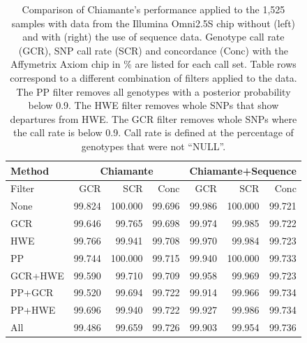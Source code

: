 \begin{table}[p]
\begin{center}
\begin{tabular}{|l|rrr|rrr|}
  \hline
  Method & \multicolumn{3}{c|}{Chiamante}& \multicolumn{3}{c|}{Chiamante+Sequence}\\
  \hline
  Filter & GCR & SCR & Conc & GCR & SCR & Conc \\ 
  \hline
  None & 99.824 & 100.000 & 99.696 & 99.986 & 100.000 & 99.721 \\ 
  GCR & 99.646 & 99.765 & 99.698 & 99.974 & 99.985 & 99.722 \\ 
  HWE & 99.766 & 99.941 & 99.708 & 99.970 & 99.984 & 99.723 \\ 
  PP & 99.744 & 100.000 & 99.715 & 99.940 & 100.000 & 99.733 \\ 
  \hline
  GCR+HWE & 99.590 & 99.710 & 99.709 & 99.958 & 99.969 & 99.723 \\ 
  PP+GCR & 99.520 & 99.694 & 99.722 & 99.914 & 99.966 & 99.734 \\ 
  PP+HWE & 99.696 & 99.940 & 99.722 & 99.927 & 99.986 & 99.734 \\ 
  \hline
  All & 99.486 & 99.659 & 99.726 & 99.903 & 99.954 & 99.736 \\ 
  \hline
\end{tabular}
\caption[Performance with and without and with the use of sequence data. ]{Comparison of Chiamante's performance applied to the 1,525 samples with data from the Illumina Omni2.5S chip without (left) and with (right) the use of sequence data. Genotype call rate (GCR), SNP call rate (SCR) and concordance (Conc) with the Affymetrix Axiom chip in \% are listed for each call set. Table rows correspond to a different combination of filters applied to the data. The PP filter removes all genotypes with a posterior probability below 0.9.  The HWE filter removes whole SNPs that show departures from HWE. The GCR filter removes whole SNPs where the call rate is below 0.9. Call rate is defined at the percentage of genotypes that were not ``NULL''.}
\label{tab_seq1,525}
\end{center}
\end{table}

